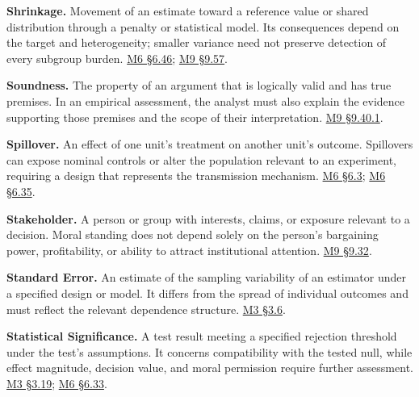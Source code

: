 \noindent\textbf{Shrinkage.} Movement of an estimate toward a reference value or
shared distribution through a penalty or statistical model. Its
consequences depend on the target and heterogeneity; smaller variance
need not preserve detection of every subgroup burden.
\href{Marketing_Analytics_Lecture_Notes.pdf\#M06-greater-precision-and-fewer-detected-harms}{M6
§6.46};
\hyperref[M09-heterogeneity-and-the-interpretation-of-consumer-harm]{M9
§9.57}.

\noindent\textbf{Soundness.} The property of an argument that is logically valid
and has true premises. In an empirical assessment, the analyst must also
explain the evidence supporting those premises and the scope of their
interpretation.
\hyperref[M09-validity-soundness-and-evidential-support]{M9
§9.40.1}.

\noindent\textbf{Spillover.} An effect of one unit's treatment on another unit's
outcome. Spillovers can expose nominal controls or alter the population
relevant to an experiment, requiring a design that represents the
transmission mechanism.
\href{Marketing_Analytics_Lecture_Notes.pdf\#M06-designing-an-experiment-around-the-decision}{M6
§6.3};
\href{Marketing_Analytics_Lecture_Notes.pdf\#M06-institutional-exposure-and-the-meaning-of-an-untreated-utility}{M6
§6.35}.

\noindent\textbf{Stakeholder.} A person or group with interests, claims, or
exposure relevant to a decision. Moral standing does not depend solely
on the person's bargaining power, profitability, or ability to attract
institutional attention.
\hyperref[M09-who-counts-as-a-stakeholder-and-why]{M9
§9.32}.

\noindent\textbf{Standard Error.} An estimate of the sampling variability of an
estimator under a specified design or model. It differs from the spread
of individual outcomes and must reflect the relevant dependence
structure.
\href{Marketing_Analytics_Lecture_Notes.pdf\#M03-uncertainty-dependence-and-practical-importance}{M3
§3.6}.

\noindent\textbf{Statistical Significance.} A test result meeting a specified
rejection threshold under the test's assumptions. It concerns
compatibility with the tested null, while effect magnitude, decision
value, and moral permission require further assessment.
\href{Marketing_Analytics_Lecture_Notes.pdf\#M03-p-values-across-repeated-marketing-experiments}{M3
§3.19};
\href{Marketing_Analytics_Lecture_Notes.pdf\#M06-testing-electricity-price-interpretations-against-the-reported-tables}{M6
§6.33}.

